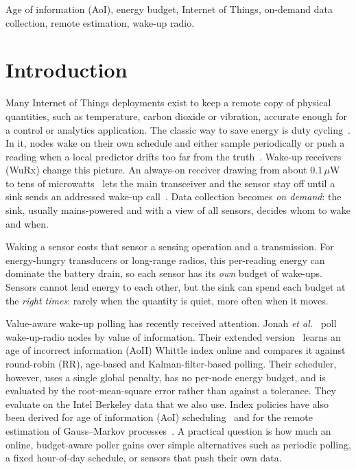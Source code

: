 \documentclass[conference]{IEEEtran}
\begin{document}
\begin{IEEEkeywords}
Age of information (AoI), energy budget, Internet of Things, on-demand data collection, remote estimation, wake-up radio.
\end{IEEEkeywords}

\section{Introduction}\label{sec:intro}
Many Internet of Things deployments exist to keep a remote copy of
physical quantities, such as temperature, carbon dioxide or vibration, accurate enough
for a control or analytics application. The classic way to save energy is duty
cycling~\cite{polastre2004,buettner2006}. In it, nodes wake on their own schedule
and either sample periodically or push a reading when a local predictor drifts
too far from the truth~\cite{santini2006}. Wake-up receivers (WuRx) change this
picture. An always-on receiver drawing from about $0.1\,\mu$W to tens of
microwatts~\cite{piyare2017,magno2016} lets the main transceiver and the sensor stay
off until a sink sends an addressed wake-up call~\cite{oller2016}. Data
collection becomes \emph{on demand}: the sink, usually mains-powered and with a
view of all sensors, decides whom to wake and when.

Waking a sensor costs that sensor a sensing operation and a transmission. For
energy-hungry transducers or long-range radios, this per-reading energy can
dominate the battery drain, so each sensor has its \emph{own} budget of
wake-ups. Sensors cannot lend energy to each other, but the sink can spend each
budget at the \emph{right times}: rarely when the quantity is quiet, more often
when it moves.

Value-aware wake-up polling has recently received attention. Jonah
\emph{et al.}~\cite{jonah2025} poll wake-up-radio nodes by value of
information. Their extended version~\cite{jonah2026fair} learns an age of
incorrect information (AoII) Whittle index online and compares it against
round-robin (RR), age-based and Kalman-filter-based polling. Their scheduler,
however, uses a single global penalty, has no per-node energy budget, and is
evaluated by the root-mean-square error rather than against a tolerance. They
evaluate on the Intel Berkeley data that we also use. Index policies have also
been derived for age of information (AoI) scheduling~\cite{kadota2018} and
for the remote estimation of Gauss--Markov processes~\cite{ornee2023whittle}. A
practical question is how much an online, budget-aware poller gains over simple
alternatives such as periodic polling, a fixed hour-of-day schedule, or sensors
that push their own data.
\end{document}
